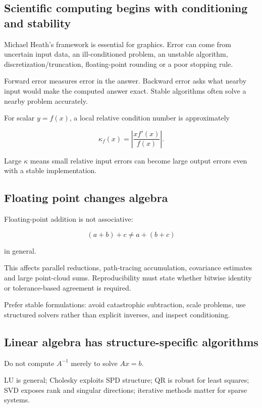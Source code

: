\subsection{Scientific computing begins with conditioning and stability}\label{scientific-computing-begins-with-conditioning-and-stability}

Michael Heath's framework is essential for graphics. Error can come from uncertain input data, an ill-conditioned problem, an unstable algorithm, discretization/truncation, floating-point rounding or a poor stopping rule.

Forward error measures error in the answer. Backward error asks what nearby input would make the computed answer exact. Stable algorithms often solve a nearby problem accurately.

For scalar \(y=f(x)\), a local relative condition number is approximately

\[
\kappa_f(x)=\left|\frac{x f'(x)}{f(x)}\right|.
\]

Large \(\kappa\) means small relative input errors can become large output errors even with a stable implementation.

\subsection{Floating point changes algebra}\label{floating-point-changes-algebra}

Floating-point addition is not associative:

\[
(a+b)+c\neq a+(b+c)
\]

in general.

This affects parallel reductions, path-tracing accumulation, covariance estimates and large point-cloud sums. Reproducibility must state whether bitwise identity or tolerance-based agreement is required.

Prefer stable formulations: avoid catastrophic subtraction, scale problems, use structured solvers rather than explicit inverses, and inspect conditioning.

\subsection{Linear algebra has structure-specific algorithms}\label{linear-algebra-has-structure-specific-algorithms}

Do not compute \(A^{-1}\) merely to solve \(Ax=b\).

LU is general; Cholesky exploits SPD structure; QR is robust for least squares; SVD exposes rank and singular directions; iterative methods matter for sparse systems.

